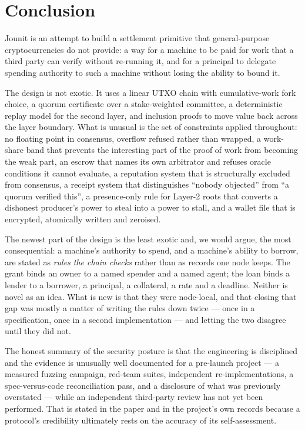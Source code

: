 \documentclass{article}
\begin{document}
\section{Conclusion}
\label{sec:conclusion}

Jounit is an attempt to build a settlement primitive that general-purpose
cryptocurrencies do not provide: a way for a machine to be paid for work that a
third party can verify without re-running it, and for a principal to delegate
spending authority to such a machine without losing the ability to bound it.

The design is not exotic. It uses a linear UTXO chain with cumulative-work
fork choice, a quorum certificate over a stake-weighted committee, a
deterministic replay model for the second layer, and inclusion proofs to move
value back across the layer boundary. What is unusual is the set of constraints
applied throughout: no floating point in consensus, overflow refused rather
than wrapped, a work-share band that prevents the interesting part of the
proof of work from becoming the weak part, an escrow that names its own
arbitrator and refuses oracle conditions it cannot evaluate, a reputation
system that is structurally excluded from consensus, a receipt system that
distinguishes ``nobody objected'' from ``a quorum verified this'', a
presence-only rule for Layer-2 roots that converts a dishonest producer's
power to steal into a power to stall, and a wallet file that is encrypted,
atomically written and zeroised.

The newest part of the design is the least exotic and, we would argue, the most
consequential: a machine's authority to spend, and a machine's ability to
borrow, are stated as \emph{rules the chain checks} rather than as records one
node keeps. The grant binds an owner to a named spender and a named agent; the
loan binds a lender to a borrower, a principal, a collateral, a rate and a
deadline. Neither is novel as an idea. What is new is that they were
node-local, and that closing that gap was mostly a matter of writing the rules
down twice --- once in a specification, once in a second implementation --- and
letting the two disagree until they did not.

The honest summary of the security posture is that the engineering is
disciplined and the evidence is unusually well documented for a pre-launch
project --- a measured fuzzing campaign, red-team suites, independent
re-implementations, a spec-versus-code reconciliation pass, and a
disclosure of what was previously overstated --- while an independent
third-party review has not yet been performed. That is stated in the paper and
in the project's own records because a protocol's credibility ultimately rests
on the accuracy of its self-assessment.
\end{document}
